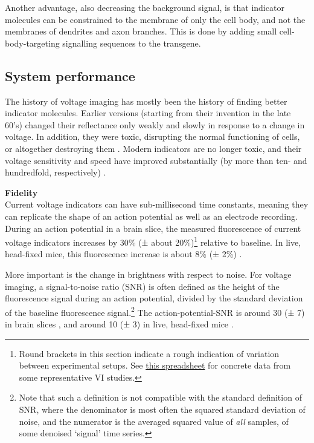 Another advantage, also decreasing the background signal, is that indicator molecules can be constrained to the membrane of only the cell body, and not the membranes of dendrites and axon branches. This is done by adding small cell-body-targeting signalling sequences to the transgene.



\subsection{System performance}

The history of voltage imaging has mostly been the history of finding better indicator molecules. Earlier versions (starting from their invention in the late 60's) changed their reflectance only weakly and slowly in response to a change in voltage. In addition, they were toxic, disrupting the normal functioning of cells, or altogether destroying them \cite{Salzberg1973OpticalRecordingImpulses,Zochowski2000ImagingMembranePotential}.
Modern indicators are no longer toxic, and their voltage sensitivity and speed have improved substantially (by more than ten- and hundredfold, respectively) \cite{Miller2016SmallMoleculeFluorescent,Tomina2018DualsidedVoltagesensitiveDye}.


\textbf{Fidelity}\\
Current voltage indicators can have sub-millisecond time constants, meaning they can replicate the shape of an action potential as well as an electrode recording. During an action potential in a brain slice, the measured fluorescence of current voltage indicators increases by 30\% (± about 20\%)\footnote{
    Round brackets in this section indicate a rough indication of variation between experimental setups. See \href{https://docs.google.com/spreadsheets/d/1W9Y3az4i1xdvahpdyqtsTG8F81LXK2T6wzRgsXHN3z0/edit}{this spreadsheet} for concrete data from some representative VI studies.
} \cite{Piatkevich2019PopulationImagingNeural,Adam2019VoltageImagingOptogenetics}
relative to baseline. In live, head-fixed mice, this fluorescence increase is about 8\% (± 2\%) \cite{Abdelfattah2019BrightPhotostableChemigenetic,Villette2019UltrafastTwoPhotonImaging}.

More important is the change in brightness with respect to noise. For voltage imaging, a signal-to-noise ratio (SNR) is often defined as the height of the fluorescence signal during an action potential, divided by the standard deviation of the baseline fluorescence signal.\footnote{
    Note that such a definition is not compatible with the standard definition of SNR, where the denominator is most often the squared standard deviation of noise, and the numerator is the averaged squared value of \emph{all} samples, of some denoised `signal' time series.
}
The action-potential-SNR is around 30 (± 7) in brain slices \cite{Adam2019VoltageImagingOptogenetics,Piatkevich2019PopulationImagingNeural}, and around 10 (± 3) in live, head-fixed mice \cite{Abdelfattah2019BrightPhotostableChemigenetic,Villette2019UltrafastTwoPhotonImaging}.

